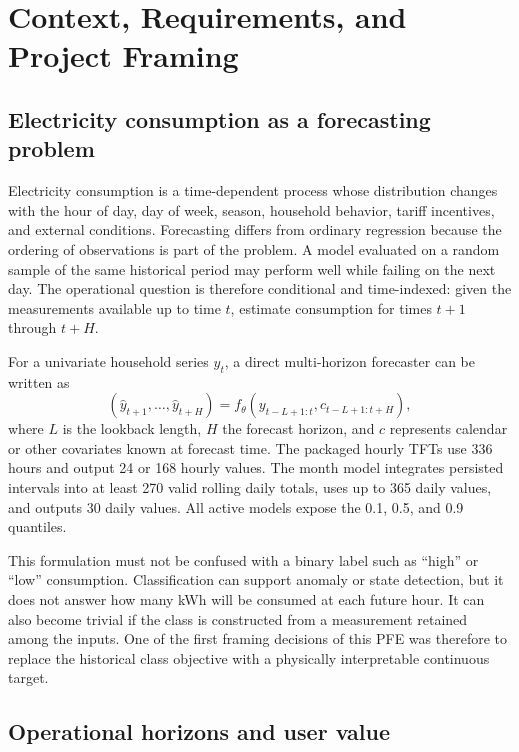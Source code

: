 \chapter{Context, Requirements, and Project Framing}
\label{chap:context}

\section{Electricity consumption as a forecasting problem}

Electricity consumption is a time-dependent process whose distribution changes with the hour of day, day of week, season, household behavior, tariff incentives, and external conditions. Forecasting differs from ordinary regression because the ordering of observations is part of the problem. A model evaluated on a random sample of the same historical period may perform well while failing on the next day. The operational question is therefore conditional and time-indexed: given the measurements available up to time $t$, estimate consumption for times $t+1$ through $t+H$.

For a univariate household series $y_t$, a direct multi-horizon forecaster can be written as
\begin{equation}
  (\hat y_{t+1},\ldots,\hat y_{t+H}) = f_{\theta}(y_{t-L+1:t}, c_{t-L+1:t+H}),
  \label{eq:forecast}
\end{equation}
where $L$ is the lookback length, $H$ the forecast horizon, and $c$ represents calendar or other covariates known at forecast time. The packaged hourly TFTs use 336 hours and output 24 or 168 hourly values. The month model integrates persisted intervals into at least 270 valid rolling daily totals, uses up to 365 daily values, and outputs 30 daily values. All active models expose the 0.1, 0.5, and 0.9 quantiles.

This formulation must not be confused with a binary label such as ``high'' or ``low'' consumption. Classification can support anomaly or state detection, but it does not answer how many kWh will be consumed at each future hour. It can also become trivial if the class is constructed from a measurement retained among the inputs. One of the first framing decisions of this PFE was therefore to replace the historical class objective with a physically interpretable continuous target.

\section{Operational horizons and user value}

